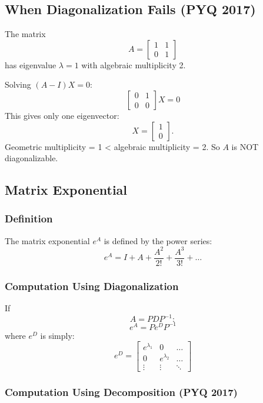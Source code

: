 \documentclass[
]{article}
\begin{document}
\subsection{When Diagonalization Fails (PYQ
2017)}\label{when-diagonalization-fails-pyq-2017}

The matrix
\[
A =
\begin{bmatrix}
1 & 1 \\
0 & 1
\end{bmatrix}
\]
has eigenvalue \(\lambda = 1\) with algebraic multiplicity 2.

Solving \((A - I)X = 0\):
\[
\begin{bmatrix}
0 & 1 \\
0 & 0
\end{bmatrix}X = 0
\]
This gives only one eigenvector:
\[
X =
\begin{bmatrix}
1 \\
0
\end{bmatrix}.
\]
Geometric multiplicity = 1 \textless{} algebraic multiplicity = 2. So
\(A\) is NOT diagonalizable.

\subsection{Matrix Exponential}\label{matrix-exponential}

\subsubsection{Definition}\label{definition-15}

The matrix exponential \(e^A\) is defined by the power series:
\[
e^A = I + A + \frac{A^2}{2!} + \frac{A^3}{3!} + \dots
\]
\subsubsection{Computation Using
Diagonalization}\label{computation-using-diagonalization}

If
\[
A = PDP^{-1}:
\]
\[
e^A = Pe^D P^{-1}
\]
where \(e^D\) is simply:
\[
e^D =
\begin{bmatrix}
e^{\lambda_1} & 0 & \dots \\
0 & e^{\lambda_2} & \dots \\
\vdots & \vdots & \ddots
\end{bmatrix}
\]
\subsubsection{Computation Using Decomposition (PYQ
2017)}\label{computation-using-decomposition-pyq-2017}
\end{document}
